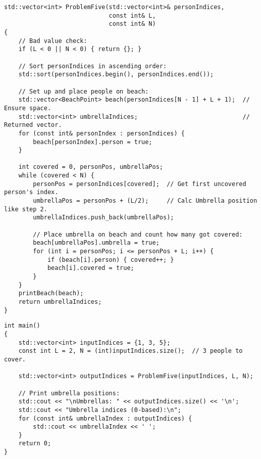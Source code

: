 \documentclass[11pt]{article}
\begin{document}
\begin{verbatim}
std::vector<int> ProblemFive(std::vector<int>& personIndices,
                             const int& L,
                             const int& N)
{
    // Bad value check:
    if (L < 0 || N < 0) { return {}; }

    // Sort personIndices in ascending order:
    std::sort(personIndices.begin(), personIndices.end());

    // Set up and place people on beach:
    std::vector<BeachPoint> beach(personIndices[N - 1] + L + 1);  // Ensure space.
    std::vector<int> umbrellaIndices;                             // Returned vector.
    for (const int& personIndex : personIndices) {
        beach[personIndex].person = true;
    }

    int covered = 0, personPos, umbrellaPos;
    while (covered < N) {
        personPos = personIndices[covered];  // Get first uncovered person's index.
        umbrellaPos = personPos + (L/2);     // Calc Umbrella position like step 2.
        umbrellaIndices.push_back(umbrellaPos);

        // Place umbrella on beach and count how many got covered:
        beach[umbrellaPos].umbrella = true;
        for (int i = personPos; i <= personPos + L; i++) {
            if (beach[i].person) { covered++; }
            beach[i].covered = true;
        }
    }
    printBeach(beach);
    return umbrellaIndices;
}
\end{verbatim}
\pagebreak

\begin{verbatim}
int main()
{
    std::vector<int> inputIndices = {1, 3, 5};
    const int L = 2, N = (int)inputIndices.size();  // 3 people to cover.

    std::vector<int> outputIndices = ProblemFive(inputIndices, L, N);

    // Print umbrella positions:
    std::cout << "\nUmbrellas: " << outputIndices.size() << '\n';
    std::cout << "Umbrella indices (0-based):\n";
    for (const int& umbrellaIndex : outputIndices) {
        std::cout << umbrellaIndex << ' ';
    }
    return 0;
}
\end{verbatim}
\end{document}
